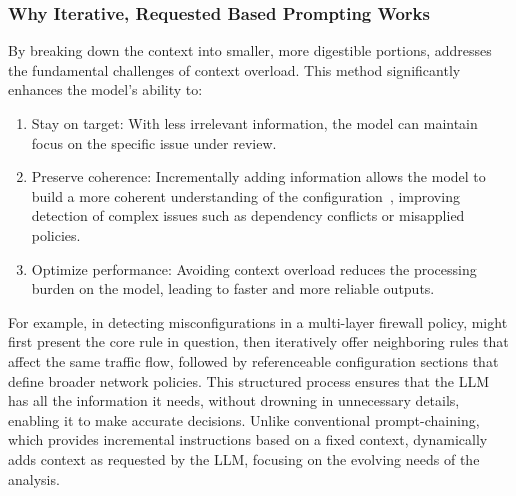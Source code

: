 \subsubsection{Why Iterative, Requested Based Prompting Works}
By breaking down the context into smaller, more digestible portions, \sysname{} addresses the fundamental challenges of context overload. This method significantly enhances the model’s ability to:
\begin{enumerate}
    \item Stay on target: With less irrelevant information, the model can maintain focus on the specific issue under review.
    \item Preserve coherence: Incrementally adding information allows the model to build a more coherent understanding of the configuration~\cite{li2023prompt,subramonyam2024bridging}, improving detection of complex issues such as dependency conflicts or misapplied policies.
    \item Optimize performance: Avoiding context overload reduces the processing burden on the model, leading to faster and more reliable outputs.
\end{enumerate}

For example, in detecting misconfigurations in a multi-layer firewall policy, \sysname{} might first present the core rule in question, then iteratively offer neighboring rules that affect the same traffic flow, followed by referenceable configuration sections that define broader network policies. This structured process ensures that the LLM has all the information it needs, without drowning in unnecessary details, enabling it to make accurate decisions. Unlike conventional prompt-chaining, which provides incremental instructions based on a fixed context, \sysname{} dynamically adds context as requested by the LLM, focusing on the evolving needs of the analysis.

